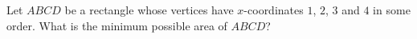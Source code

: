 Let $ABCD$ be a rectangle whose vertices have $x$-coordinates $1$, $2$, $3$ and $4$ in some order. What is the minimum possible area of $ABCD$?
